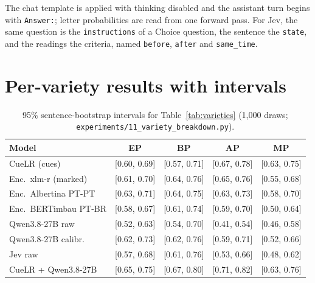 \documentclass[11pt]{article}
\begin{document}
\noindent The chat template is applied with thinking disabled and the assistant turn begins with \texttt{Answer:}; letter probabilities are read from one forward pass. For Jev, the same question is the \texttt{instructions} of a Choice question, the sentence the \texttt{state}, and the readings the criteria, named \texttt{before}, \texttt{after} and \texttt{same\_time}.

\section{Per-variety results with intervals}
\label{app:varieties}
\begin{table}[h]
\centering\scriptsize
\setlength{\tabcolsep}{2pt}
\begin{tabular}{lcccc}
\toprule
Model & EP & BP & AP & MP \\
\midrule
CueLR (cues) & [0.60, 0.69] & [0.57, 0.71] & [0.67, 0.78] & [0.63, 0.75] \\
Enc.\ xlm-r (marked) & [0.61, 0.70] & [0.64, 0.76] & [0.65, 0.76] & [0.55, 0.68] \\
Enc.\ Albertina PT-PT & [0.63, 0.71] & [0.64, 0.75] & [0.63, 0.73] & [0.58, 0.70] \\
Enc.\ BERTimbau PT-BR & [0.58, 0.67] & [0.61, 0.74] & [0.59, 0.70] & [0.50, 0.64] \\
Qwen3.8-27B raw & [0.52, 0.63] & [0.54, 0.70] & [0.41, 0.54] & [0.46, 0.58] \\
Qwen3.8-27B calibr. & [0.62, 0.73] & [0.62, 0.76] & [0.59, 0.71] & [0.52, 0.66] \\
Jev raw & [0.57, 0.68] & [0.61, 0.76] & [0.53, 0.66] & [0.48, 0.62] \\
CueLR + Qwen3.8-27B & [0.65, 0.75] & [0.67, 0.80] & [0.71, 0.82] & [0.63, 0.76] \\
\bottomrule
\end{tabular}
\caption{95\% sentence-bootstrap intervals for Table~\ref{tab:varieties} (1,000 draws; \texttt{experiments/11\_variety\_breakdown.py}).}
\label{tab:varieties-ci}
\end{table}
\end{document}

